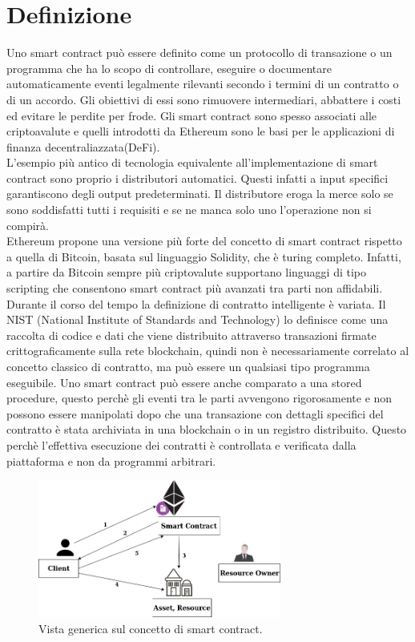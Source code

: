 \documentclass[a4paper,11pt]{report}
\begin{document}
\section{Definizione}
Uno smart contract può essere definito come un protocollo di transazione o un programma che ha lo scopo di controllare, eseguire o documentare automaticamente eventi legalmente rilevanti secondo i termini di un contratto o di un accordo. Gli obiettivi di essi sono rimuovere intermediari, abbattere i costi ed evitare le perdite per frode. Gli smart contract sono spesso associati alle criptoavalute e quelli introdotti da Ethereum sono le basi per le applicazioni di finanza decentraliazzata(DeFi).\\
L'esempio più antico di tecnologia equivalente all'implementazione di smart contract sono proprio i distributori automatici. Questi infatti a input specifici garantiscono degli output predeterminati. Il distributore eroga la merce solo se sono soddisfatti tutti i requisiti e se ne manca solo uno l'operazione non si compirà.\\
Ethereum propone una versione più forte del concetto di smart contract rispetto a quella di Bitcoin, basata sul linguaggio Solidity, che è turing completo. Infatti, a partire da Bitcoin sempre più criptovalute supportano linguaggi di tipo scripting che consentono smart contract più avanzati tra parti non affidabili.\\
Durante il  corso del tempo la definizione di contratto intelligente è variata. Il NIST (National Institute of Standards and Technology) lo definisce come una raccolta di codice e dati che viene distribuito attraverso transazioni firmate crittograficamente sulla rete blockchain, quindi non è necessariamente correlato al concetto classico di contratto, ma può essere un qualsiasi tipo programma eseguibile. Uno smart contract può essere anche comparato a una stored procedure, questo perchè gli eventi tra le parti avvengono rigorosamente e non possono essere manipolati dopo che una transazione con dettagli specifici del contratto è stata archiviata in una blockchain o in un registro distribuito. Questo perchè l'effettiva esecuzione dei contratti è controllata e verificata dalla piattaforma e non da programmi arbitrari.
\begin{figure}[htbp] 
\begin{center}
\includegraphics[width=8cm]{img/smrt.png} 
\end{center}
\caption{Vista generica sul concetto di smart contract.}
\end{figure}
\end{document}
